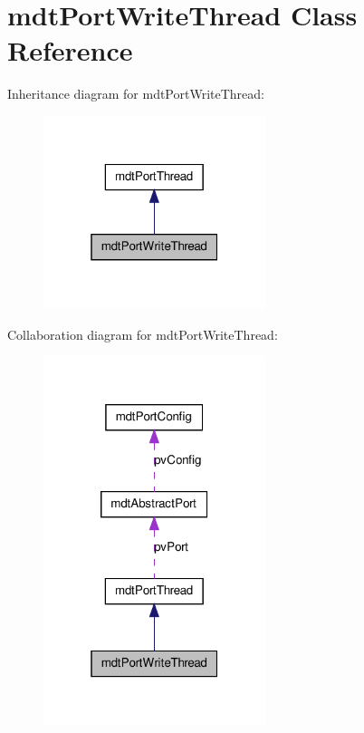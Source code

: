 \hypertarget{classmdt_port_write_thread}{
\section{mdtPortWriteThread Class Reference}
\label{classmdt_port_write_thread}
}


Inheritance diagram for mdtPortWriteThread:\nopagebreak
\begin{figure}[H]
\begin{center}
\leavevmode
\includegraphics[width=184pt]{classmdt_port_write_thread__inherit__graph}
\end{center}
\end{figure}


Collaboration diagram for mdtPortWriteThread:
\nopagebreak
\begin{figure}[H]
\begin{center}
\leavevmode
\includegraphics[width=184pt]{classmdt_port_write_thread__coll__graph}
\end{center}
\end{figure}
